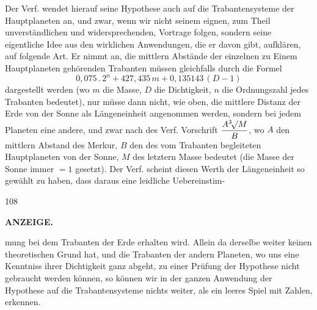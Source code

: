 Der Verf. wendet hierauf seine Hypothese auch auf die Trabantensysteme der Hauptplaneten an, und zwar, wenn wir nicht seinem eignen, zum Theil unverständlichen und widersprechenden, Vortrage folgen, sondern seine eigentliche Idee aus den wirklichen Anwendungen, die er davon gibt, aufklären, auf folgende Art. Er nimmt an, die mittlern Abstände der einzelnen zu Einem Hauptplaneten gehörenden Trabanten müssen gleichfalls durch die Formel
\[ \mathrm{0{,}075} \,.\, 2^n + \mathrm{427{,}435}\, m + \mathrm{0{,}135143}\,(D - \mathrm{1}) \]
dargestellt werden (wo $m$ die Masse, $D$ die Dichtigkeit, $n$ die Ordnungszahl jedes Trabanten bedeutet), nur müsse dann nicht, wie oben, die mittlere Distanz der Erde von der Sonne als Längeneinheit angenommen werden, sondern bei jedem Planeten eine andere, und zwar nach des Verf. Vorschrift $\dfrac{A\BareRoot[3]{M}}{B}$, wo $A$ den mittlern Abstand des Merkur, $B$ den des vom Trabanten begleiteten Hauptplaneten von der Sonne, $M$ des letztern Masse bedeutet (die Masse der Sonne immer $= \mathrm{1}$ gesetzt). Der Verf. scheint diesen Werth der Längeneinheit so gewählt zu haben, dass daraus eine leidliche Uebereinstim-\par
\vfill
{}\hfill{\small 108}\hspace*{.18\textwidth}\par
\clearpage
{}
\noindent{}%
\parbox[b]{\dimexpr\textwidth-20mm\relax}{\centering\small\textbf{ANZEIGE.}}%
\makebox[10mm][r]{}\par\nobreak\medskip
\noindent mung bei dem Trabanten der Erde erhalten wird. Allein da derselbe weiter keinen theoretischen Grund hat, und die Trabanten der andern Planeten, wo uns eine Kenntniss ihrer Dichtigkeit ganz abgeht, zu einer Prüfung der Hypothese nicht gebraucht werden können, so können wir in der ganzen Anwendung der Hypothese auf die Trabantensysteme nichts weiter, als ein leeres Spiel mit Zahlen, erkennen.
